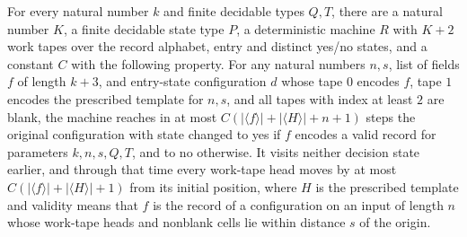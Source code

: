 \begin{theorem}
\label{Turing.exists_recordValidTM}
\leanok
{}
For every natural number $k$ and finite decidable types $Q,T$, there are a natural
number $K$, a finite decidable state type $P$, a deterministic machine $R$ with $K+2$
work tapes over the record alphabet, entry and distinct yes/no states, and a constant
$C$ with the following property. For any natural numbers $n,s$, list of fields $f$ of
length $k+3$, and entry-state configuration $d$ whose tape $0$ encodes $f$, tape $1$
encodes the prescribed template for $n,s$, and all tapes with index at least $2$ are
blank, the machine reaches in at most $C(|\langle f\rangle|+|\langle H\rangle|+n+1)$
steps the original configuration with state changed to yes if $f$ encodes a valid record
for parameters $k,n,s,Q,T$, and to no otherwise. It visits neither decision state
earlier, and through that time every work-tape head moves by at most $C(|\langle
f\rangle|+|\langle H\rangle|+1)$ from its initial position, where $H$ is the prescribed
template and validity means that $f$ is the record of a configuration on an input of
length $n$ whose work-tape heads and nonblank cells lie within distance $s$ of the
origin.
\end{theorem}

